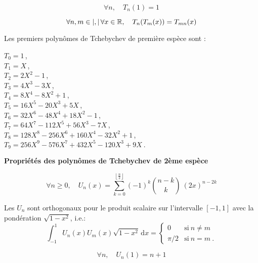 \begin{equation}
\forall n, \quad
    T_n(1)=1
\end{equation}

\begin{equation}
\forall n,m\in\left| ,\right| \forall x\in\mathbb R, \quad
    T_n(T_m(x))=T_{mn}(x)
\end{equation}

\medskip
{}
Les premiers polynômes de Tchebychev de première espèce sont :

\noindent
    $T_0 = 1 \,$,\\
    $T_1 = X \,$,\\
    $T_2 = 2X^2 - 1 \,$,\\
    $T_3 = 4X^3 - 3X \,$,\\
   $ T_4 = 8X^4 - 8X^2 + 1 \,$,\\
   $ T_5 = 16X^5 - 20X^3 + 5X \,$,\\
   $ T_6 = 32X^6 - 48X^4 + 18X^2 - 1 \,$,\\
   $ T_7 = 64X^7 - 112X^5 + 56X^3 - 7X \,$,\\
   $ T_8 = 128X^8 - 256X^6 + 160X^4 - 32X^2 + 1 \,$,\\
    $T_9 = 256X^9 - 576X^7 + 432X^5 - 120X^3 + 9X~.$ 

\medskip
\textbf{Propriétés des polynômes de Tchebychev de 2ème espèce}

\begin{equation}\forall n\ge 0, \quad
    U_n(x)=\sum_{k=0}^{\left\lfloor \frac n2\right \rfloor}(-1)^k \binom{n-k}k~(2x)^{n-2k}
\end{equation}

 Les $U_n$ sont orthogonaux pour le produit scalaire 
sur l'intervalle $[-1,1]$ avec la pondération $\sqrt{1-x^2}$, i.e.:
\begin{equation}
    \int_{-1}^1 U_n(x)U_m(x)\sqrt{1-x^2}\,\mathrm{d}x = \begin{cases} 0&\text{si}~n\ne m\\ \pi/2 &\text{si}~n=m~. \end{cases} 
\end{equation}

\begin{equation}\forall n,\quad 
    U_n(1)=n+1
\end{equation}


